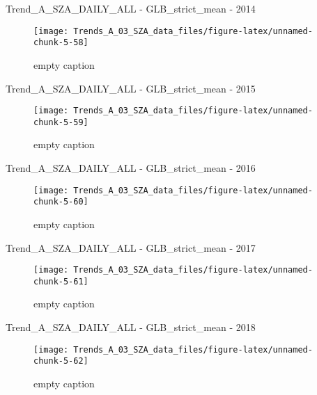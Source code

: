 \documentclass[
  10pt,
  a4paper,oneside]{article}
\begin{document}
Trend\_A\_SZA\_DAILY\_ALL - GLB\_strict\_mean - 2014

\begin{figure}[!ht]

{\centering \texttt{[image: Trends\_A\_03\_SZA\_data\_files/figure-latex/unnamed-chunk-5-58]} 

}

\caption{ empty caption }\label{fig:unnamed-chunk-5-58}
\end{figure}

Trend\_A\_SZA\_DAILY\_ALL - GLB\_strict\_mean - 2015

\begin{figure}[!ht]

{\centering \texttt{[image: Trends\_A\_03\_SZA\_data\_files/figure-latex/unnamed-chunk-5-59]} 

}

\caption{ empty caption }\label{fig:unnamed-chunk-5-59}
\end{figure}

Trend\_A\_SZA\_DAILY\_ALL - GLB\_strict\_mean - 2016

\begin{figure}[!ht]

{\centering \texttt{[image: Trends\_A\_03\_SZA\_data\_files/figure-latex/unnamed-chunk-5-60]} 

}

\caption{ empty caption }\label{fig:unnamed-chunk-5-60}
\end{figure}

Trend\_A\_SZA\_DAILY\_ALL - GLB\_strict\_mean - 2017

\begin{figure}[!ht]

{\centering \texttt{[image: Trends\_A\_03\_SZA\_data\_files/figure-latex/unnamed-chunk-5-61]} 

}

\caption{ empty caption }\label{fig:unnamed-chunk-5-61}
\end{figure}

Trend\_A\_SZA\_DAILY\_ALL - GLB\_strict\_mean - 2018

\begin{figure}[!ht]

{\centering \texttt{[image: Trends\_A\_03\_SZA\_data\_files/figure-latex/unnamed-chunk-5-62]} 

}

\caption{ empty caption }\label{fig:unnamed-chunk-5-62}
\end{figure}
\end{document}
